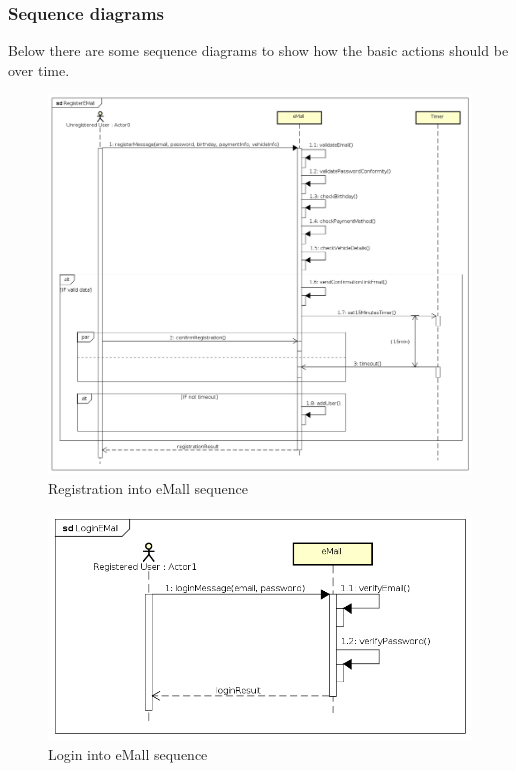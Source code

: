 \subsubsection{Sequence diagrams}
Below there are some sequence diagrams to show how the basic actions should be over time.
\begin{figure}[!h]
    \begin{center}
        \includegraphics[keepaspectratio, width=16cm]{Sequence/RegisterEMall.png}
        \caption{Registration into \ac{eMall} sequence}
    \end{center}
\end{figure}
\begin{figure}[!h]
    \begin{center}
        \includegraphics[keepaspectratio, width=16cm]{Sequence/LoginEMall.png}
        \caption{Login into \ac{eMall} sequence}
    \end{center}
\end{figure}
